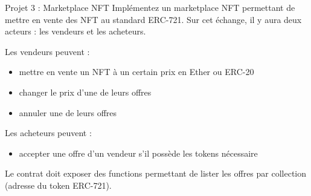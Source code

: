 \begin{frame}{Projet 3 : Marketplace NFT}
  Implémentez un marketplace NFT permettant de mettre en vente des NFT au standard ERC-721.
  Sur cet échange, il y aura deux acteurs : les vendeurs et les acheteurs.

  Les vendeurs peuvent :

  \begin{itemize}
    \item mettre en vente un NFT à un certain prix en Ether ou ERC-20
    \item changer le prix d'une de leurs offres
    \item annuler une de leurs offres
  \end{itemize}

  Les acheteurs peuvent :

  \begin{itemize}
    \item accepter une offre d'un vendeur s'il possède les tokens nécessaire
  \end{itemize}

  Le contrat doit exposer des functions permettant de lister les offres par collection (adresse du token ERC-721).
\end{frame}